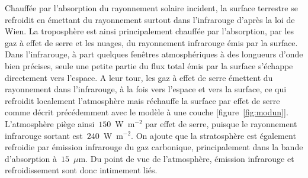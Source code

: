 \sk
Chauffée par l'absorption du rayonnement solaire incident, la surface terrestre se refroidit en émettant du rayonnement surtout dans l'infrarouge d'après la loi de Wien. La troposphère est ainsi principalement chauffée par l'absorption, par les gaz à effet de serre et les nuages, du rayonnement infrarouge émis par la surface. Dans l'infrarouge, à part quelques fenêtres atmosphériques à des longueurs d'onde bien précises, seule une petite partie du flux total émis par la surface s'échappe directement vers l'espace. A leur tour, les gaz à effet de serre émettent du rayonnement dans l'infrarouge, à la fois vers l'espace et vers la surface, ce qui refroidit localement l'atmosphère mais réchauffe la surface par effet de serre comme décrit précédemment avec le modèle à une couche [figure~\ref{fig:modun}]. L'atmosphère piège ainsi~$150$~W~m$^{-2}$ par effet de serre, puisque le rayonnement infrarouge sortant est~$240$~W~m$^{-2}$. On ajoute que la stratosphère est également refroidie par émission infrarouge du gaz carbonique, principalement dans la bande d'absorption à~$15$~$\mu$m. Du point de vue de l'atmosphère, émission infrarouge et refroidissement sont donc intimement liés.

